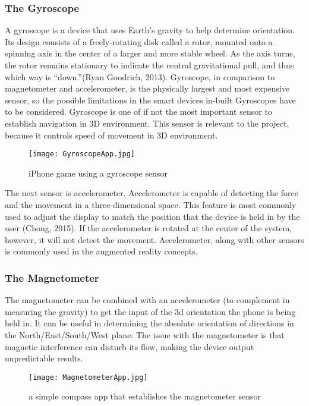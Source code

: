 \subsubsection*{The Gyroscope}
A gyroscope is a device that uses Earth's gravity to help determine orientation. Its design consists of a freely-rotating disk called a rotor, mounted onto a spinning axis in the center of a larger and more stable wheel. As the axis turns, the rotor remains stationary to indicate the central gravitational pull, and thus which way is “down.”(Ryan Goodrich, 2013). Gyroscope, in comparison to magnetometer and accelerometer, is the physically largest and most expensive sensor, so the possible limitations in the smart devices in-built Gyroscopes have to be considered. Gyroscope is one of if not the most important sensor to establish navigation in 3D environment. This sensor is relevant to the project, because it controls speed of movement in 3D environment. 

\begin{figure}[H]
\centering
\texttt{[image: GyroscopeApp.jpg]}
\caption{iPhone game using a gyroscope sensor}
\end{figure}


The next sensor is accelerometer. Accelerometer is capable of detecting the force and the movement in a three-dimensional space. This feature is most commonly used to adjust the display to match the position that the device is held in by the user (Chong, 2015). If the accelerometer is rotated at the center of the system, however, it will not detect the movement. Accelerometer, along with other sensors is commonly used in the augmented reality concepts.

\subsubsection*{The Magnetometer}
The magnetometer can be combined with an accelerometer (to complement in measuring the gravity) to get the input of the 3d orientation the phone is being held in. It can be useful in determining the absolute orientation of directions in the North/East/South/West plane. The issue with the magnetometer is that magnetic interference can disturb its flow, making the device output unpredictable results.

\begin{figure}[H]
\centering
\texttt{[image: MagnetometerApp.jpg]}
\caption{a simple compass app that establishes the magnetometer sensor}
\end{figure}

